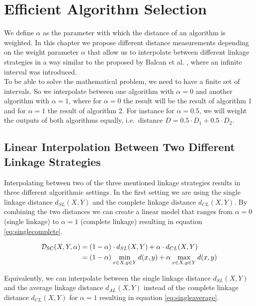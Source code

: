 \chapter{Efficient Algorithm Selection}
\label{chapter:alphalinkage}

We define $\alpha$ as the parameter with which the distance of an algorithm is weighted. In this chapter we propose different distance measurements depending on the weight parameter $\alpha$ that allow us to interpolate between different linkage strategies in a way similar to the proposed by Balcan et al. \cite{DBLP:journals/corr/BalcanNVW16}, where an infinite interval was introduced.\\

To be able to solve the mathematical problem, we need to have a finite set of intervals. So we interpolate between one algorithm with $\alpha = 0$ and another algorithm with $\alpha = 1$, where for $\alpha = 0$ the result will be the result of algorithm 1 and for $\alpha = 1$ the result of algorithm 2. For instance for $\alpha = 0.5$, we will weight the outputs of both algorithms equally, i.e.\ distance $D = 0.5 \cdot D_1 + 0.5 \cdot D_2$.

\section{Linear Interpolation Between Two Different Linkage Strategies}

Interpolating between two of the three mentioned linkage strategies results in three different algorithmic settings. In the first setting we are using the single linkage distance $d_{SL}(X,Y)$ and the complete linkage distance $d_{CL}(X,Y)$. By combining the two distances we can create a linear model that ranges from $\alpha = 0$ (single linkage) to $\alpha = 1$ (complete linkage) resulting in equation \ref{eq:singlecomplete}.

\begin{equation}
    \begin{aligned}
        \mathcal{D}_\text{SC}(X,Y,\alpha) &= (1 - \alpha) \cdot d_{SL}(X,Y) + \alpha \cdot d_{CL}(X,Y)\\
        &= (1 - \alpha) \min\limits_{x \in X, y \in Y} d(x,y) + \alpha \max\limits_{x \in X, y \in Y} d(x,y)
    \end{aligned}
    \label{eq:singlecomplete}
\end{equation}

Equivalently, we can interpolate between the single linkage distance $d_{SL}(X,Y)$ and the average linkage distance $d_{AL}(X,Y)$ instead of the complete linkage distance $d_{CL}(X,Y)$ for $\alpha = 1$ resulting in equation \ref{eq:singleaverage}. 

